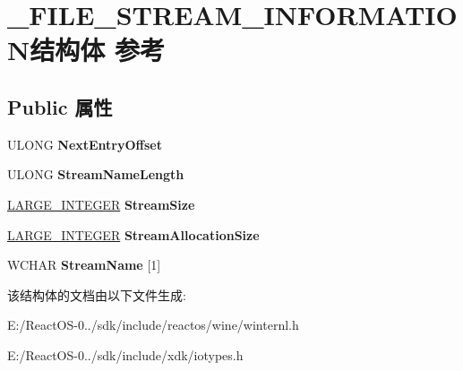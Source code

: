 \hypertarget{struct___f_i_l_e___s_t_r_e_a_m___i_n_f_o_r_m_a_t_i_o_n}{}\section{\+\_\+\+F\+I\+L\+E\+\_\+\+S\+T\+R\+E\+A\+M\+\_\+\+I\+N\+F\+O\+R\+M\+A\+T\+I\+O\+N结构体 参考}
\label{struct___f_i_l_e___s_t_r_e_a_m___i_n_f_o_r_m_a_t_i_o_n}
\subsection*{Public 属性}
\begin{DoxyCompactItemize}
\item 
\mbox{\label{struct___f_i_l_e___s_t_r_e_a_m___i_n_f_o_r_m_a_t_i_o_n_a8808ecda629f90cc0ba18cf7f5b08338}} 
U\+L\+O\+NG {\bfseries Next\+Entry\+Offset}
\item 
\mbox{\label{struct___f_i_l_e___s_t_r_e_a_m___i_n_f_o_r_m_a_t_i_o_n_a55db11eaef13662fc46e0d6f726b6462}} 
U\+L\+O\+NG {\bfseries Stream\+Name\+Length}
\item 
\mbox{\label{struct___f_i_l_e___s_t_r_e_a_m___i_n_f_o_r_m_a_t_i_o_n_a2bcc72470f322028d16cc9ab7905dbad}} 
\hyperlink{union___l_a_r_g_e___i_n_t_e_g_e_r}{L\+A\+R\+G\+E\+\_\+\+I\+N\+T\+E\+G\+ER} {\bfseries Stream\+Size}
\item 
\mbox{\label{struct___f_i_l_e___s_t_r_e_a_m___i_n_f_o_r_m_a_t_i_o_n_a6187c4c04e798bde5a76e25b7f4fd508}} 
\hyperlink{union___l_a_r_g_e___i_n_t_e_g_e_r}{L\+A\+R\+G\+E\+\_\+\+I\+N\+T\+E\+G\+ER} {\bfseries Stream\+Allocation\+Size}
\item 
\mbox{\label{struct___f_i_l_e___s_t_r_e_a_m___i_n_f_o_r_m_a_t_i_o_n_a4d7bbb7fa934e48f0f29973927e0295a}} 
W\+C\+H\+AR {\bfseries Stream\+Name} \mbox{[}1\mbox{]}
\end{DoxyCompactItemize}


该结构体的文档由以下文件生成\+:\begin{DoxyCompactItemize}
\item 
E\+:/\+React\+O\+S-\/0../sdk/include/reactos/wine/winternl.\+h\item 
E\+:/\+React\+O\+S-\/0../sdk/include/xdk/iotypes.\+h\end{DoxyCompactItemize}
